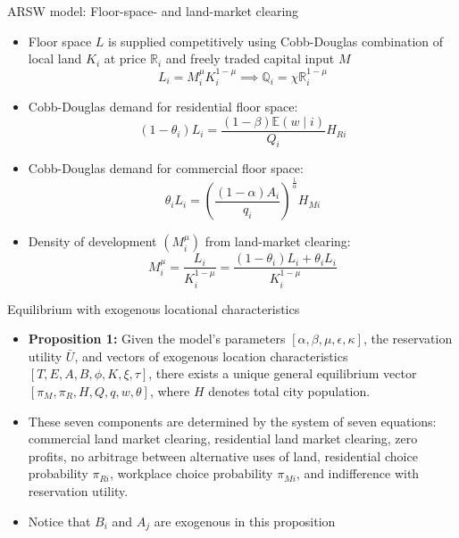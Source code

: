 \documentclass[11pt,notes=hide,aspectratio=169]{beamer}
\begin{document}
\begin{frame}{ARSW model: Floor-space- and land-market clearing}
\begin{itemize}
\item Floor space $L$ is supplied competitively using Cobb-Douglas combination of local land $K_i$ at price $\mathbb{R}_{i}$ and freely traded capital input $M$
\begin{equation*}
L_{i} = M_{i}^{\mu} K_{i}^{1-\mu}
\implies
\mathbb{Q}_{i} = \chi \mathbb{R}_{i}^{1-\mu}
\end{equation*}
\item Cobb-Douglas demand for residential floor space:
\begin{equation*} \label{eq:res_mc}
(1-\theta_{i}) L_{i} = \frac{ (1-\beta) \mathbb{E}(w \mid i) }{Q_i} H_{Ri}
\end{equation*}
\item Cobb-Douglas demand for commercial floor space:
\begin{equation*} \label{eq:com_mc}
\theta_{i} L_{i} = \left( \frac{(1-\alpha) A_{i}}{q_{i}} \right)^{\frac{1}{\alpha}} H_{Mi}
\end{equation*}
\item Density of development $(M_{i}^{\mu})$ from land-market clearing:
\[
M_{i}^{\mu} = \frac{L_{i}}{K_{i}^{1-\mu}} = \frac{(1-\theta_{i}) L_{i} + \theta_{i} L_{i}}{K_{i}^{1-\mu}}
\]
\end{itemize}
\end{frame}
\begin{frame}{Equilibrium with exogenous locational characteristics}
\begin{itemize}
\item \textbf{Proposition 1:} Given the model's parameters $[\alpha,\beta,\mu,\epsilon,\kappa]$, the reservation utility $\bar{U}$, and vectors of exogenous location characteristics $[T,E,A,B,\phi,K,\xi,\tau]$, there exists a unique general equilibrium vector $[\pi_{M},\pi_{R},H,Q,q,w,\theta]$, where $H$ denotes total city population. 
\item These seven components are determined by the system of seven equations: 
commercial land market clearing, %
residential land market clearing, %
zero profits, %
no arbitrage between alternative uses of land, %
residential choice probability $\pi_{Ri}$, %
workplace choice probability $\pi_{Mi}$, %
and indifference with reservation utility. %
\item Notice that $B_i$ and $A_j$ are exogenous in this proposition
\end{itemize}
\end{frame}
\end{document}
